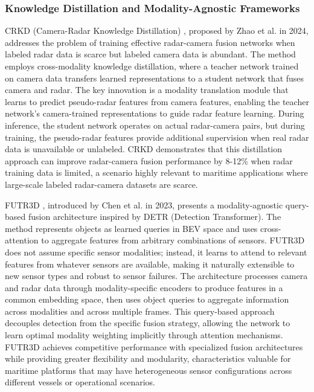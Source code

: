 \subsubsection{Knowledge Distillation and Modality-Agnostic Frameworks}

CRKD (Camera-Radar Knowledge Distillation) \cite{Zhao2024CRKD}, proposed by Zhao et al. in 2024, addresses the problem of training effective radar-camera fusion networks when labeled radar data is scarce but labeled camera data is abundant. The method employs cross-modality knowledge distillation, where a teacher network trained on camera data transfers learned representations to a student network that fuses camera and radar. The key innovation is a modality translation module that learns to predict pseudo-radar features from camera features, enabling the teacher network's camera-trained representations to guide radar feature learning. During inference, the student network operates on actual radar-camera pairs, but during training, the pseudo-radar features provide additional supervision when real radar data is unavailable or unlabeled. CRKD demonstrates that this distillation approach can improve radar-camera fusion performance by 8-12\% when radar training data is limited, a scenario highly relevant to maritime applications where large-scale labeled radar-camera datasets are scarce.

FUTR3D \cite{Chen2023FUTR3D}, introduced by Chen et al. in 2023, presents a modality-agnostic query-based fusion architecture inspired by DETR (Detection Transformer). The method represents objects as learned queries in BEV space and uses cross-attention to aggregate features from arbitrary combinations of sensors. FUTR3D does not assume specific sensor modalities; instead, it learns to attend to relevant features from whatever sensors are available, making it naturally extensible to new sensor types and robust to sensor failures. The architecture processes camera and radar data through modality-specific encoders to produce features in a common embedding space, then uses object queries to aggregate information across modalities and across multiple frames. This query-based approach decouples detection from the specific fusion strategy, allowing the network to learn optimal modality weighting implicitly through attention mechanisms. FUTR3D achieves competitive performance with specialized fusion architectures while providing greater flexibility and modularity, characteristics valuable for maritime platforms that may have heterogeneous sensor configurations across different vessels or operational scenarios.

